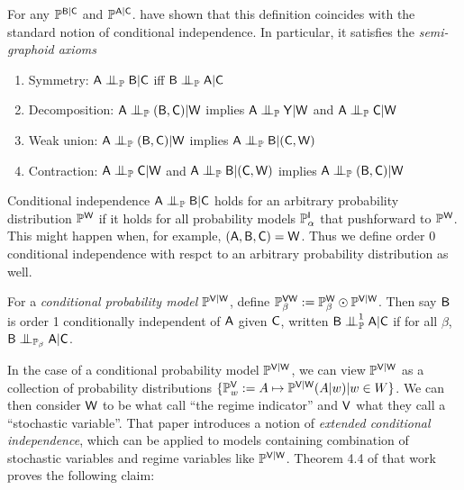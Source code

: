 For any $\mathbb{P}^{\mathsf{B}|\mathsf{C}}$ and $\mathbb{P}^{\mathsf{A}|\mathsf{C}}$. \citet{cho_disintegration_2019} have shown that this definition coincides with the standard notion of conditional independence. In particular, it satisfies the \emph{semi-graphoid axioms}

\begin{enumerate}
	\item Symmetry: $\RV{A}\CI_{\prob{P}} \RV{B}|\RV{C}$ iff $\RV{B}\CI_{\prob{P}} \RV{A}|\RV{C}$
	\item Decomposition: $\RV{A}\CI_{\prob{P}} (\RV{B},\RV{C})|\RV{W}$ implies $\RV{A}\CI_{\prob{P}}\RV{Y}|\RV{W}$ and $\RV{A}\CI_{\prob{P}}\RV{C}|\RV{W}$
	\item Weak union: $\RV{A}\CI_{\prob{P}}(\RV{B},\RV{C})|\RV{W}$ implies $\RV{A}\CI_{\prob{P}}\RV{B}|(\RV{C},\RV{W})$
	\item Contraction: $\RV{A}\CI_{\prob{P}}\RV{C}|\RV{W}$ and $\RV{A}\CI_{\prob{P}}\RV{B}|(\RV{C},\RV{W})$ implies $\RV{A}\CI_{\prob{P}}(\RV{B},\RV{C})|\RV{W}$
\end{enumerate}

Conditional independence $\RV{A}\CI_{\prob{P}}\RV{B}|\RV{C}$ holds for an arbitrary probability distribution $\mathbb{P}^{\mathsf{W}}$ if it holds for all probability models $\mathbb{P}^{\mathsf{I}}_\alpha$ that pushforward to $\mathbb{P}^{\mathsf{W}}$. This might happen when, for example, $(\mathsf{A},\mathsf{B},\mathsf{C})=\mathsf{W}$. Thus we define order 0 conditional independence with respct to an arbitrary probability distribution as well.

\begin{theorem}\label{th:cho_ci_equiv}
\end{theorem}

\begin{definition}
For a \emph{conditional probability model} $\mathbb{P}^{\mathsf{V}|\mathsf{W}}$, define $\mathbb{P}_{\beta}^{\mathsf{VW}}:=\mathbb{P}_{\beta}^{\mathsf{W}}\odot \mathbb{P}^{\mathsf{V}|\mathsf{W}}$. Then say $\mathsf{B}$ is order 1 conditionally independent of $\mathsf{A}$ given $\mathsf{C}$, written $\RV{B}\CI^1_{\prob{P}}\RV{A}|\RV{C}$ if for all $\beta$, $\RV{B}\CI_{\prob{P}_\beta}\RV{A}|\RV{C}$.
\end{definition}

In the case of a conditional probability model $\mathbb{P}^{\mathsf{V}|\mathsf{W}}$, we can view $\mathbb{P}^{\mathsf{V}|\mathsf{W}}$ as a collection of probability distributions $\{\mathbb{P}^{\mathsf{V}}_w:=A\mapsto \mathbb{P}^{\mathsf{V}|\mathsf{W}}(A|w)|w\in W\}$. We can then consider $\mathsf{W}$ to be what \citet{constantinou_extended_2017} call ``the regime indicator'' and $\mathsf{V}$ what they call a ``stochastic variable''. That paper introduces a notion of \emph{extended conditional independence}, which can be applied to models containing combination of stochastic variables and regime variables like $\mathbb{P}^{\mathsf{V}|\mathsf{W}}$.  Theorem 4.4 of that work proves the following claim:


